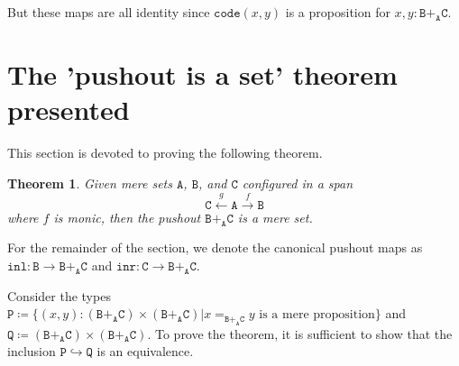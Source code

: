 \message{ !name(notes.tex)}\documentclass[12pt]{amsart}
\newcommand{\from}{\colon}
\newcommand{\xto}[1]{\xrightarrow{#1}}
\newcommand{\xgets}[1]{\xleftarrow{#1}}
\newcommand{\bydef}{\coloneqq}
\newcommand{\type}[1]{\mathtt{#1}}
\newcommand{\tin}{\colon}
\newcommand{\A}{\type{A}}
\newcommand{\B}{\type{B}}
\newcommand{\C}{\type{C}}
\renewcommand{\P}{\type{P}}
\newcommand{\Q}{\type{Q}}
\newcommand{\BAC}{\B +_{\A} \C}
\newcommand{\inl}{\type{inl}}
\newcommand{\inr}{\type{inr}}
\newcommand{\code}{\type{code}}
\newtheorem{thm}{Theorem}
\theoremstyle{remark}
\theoremstyle{definition}
\begin{document}
But these maps are all identity since \( \code (x,y) \) is a
proposition for \( x,y \tin \BAC \).   


\section{The 'pushout is a set' theorem presented}

This section is devoted to proving the following theorem.

\begin{thm} \label{thm:pushout-is-set}
  Given mere sets \( \A \), \( \B \), and \( \C \) configured in a
  span
  \[
    \C \xgets{g} \A \xto{f} \B
  \]
  where \( f \) is monic, then the pushout \( \BAC \) is a mere set.
\end{thm}

For the remainder of the section, we denote the canonical pushout maps
as
%
\(
  \inl \from \B \to \BAC
\)
%  
and
%
\(
  \inr \from \C \to \BAC.
\)
%
\par

Consider the types
%
\(
  \P \bydef
  \{ (x,y) \tin ( \BAC ) \times ( \BAC ) \vert
  x =_{\BAC} y \text{ is a mere proposition} \}
\)
%
and 
%
\(
  \Q \bydef (\BAC) \times (\BAC).
\)
%
To prove the theorem, it is sufficient to show that the inclusion
%
\(
  \P \hookrightarrow \Q
\)
%
is an equivalence. 

\end{document}
